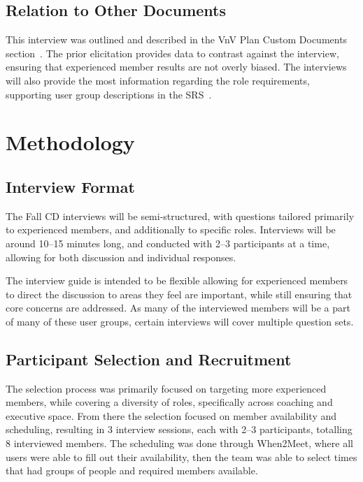 \documentclass{article}
\begin{document}
\subsection{Relation to Other Documents}

This interview was outlined and described in the VnV Plan Custom Documents section~\citep{TroitskyVnVPlan}. 
The prior elicitation provides data to contrast against the interview, ensuring that experienced member 
results are not overly biased. The interviews will also provide the most information regarding the role 
requirements, supporting user group descriptions in the SRS~\citep{TroitskySRS}.

\section{Methodology}
\label{sec:method}

\subsection{Interview Format}
The Fall CD interviews will be semi-structured, with questions tailored
primarily to experienced members, and additionally to specific roles.
Interviews will be around 10--15 minutes long, and conducted with 2--3
participants at a time, allowing for both discussion and individual responses.

The interview guide is intended to be flexible allowing for experienced members
to direct the discussion to areas they feel are important, while still ensuring
that core concerns are addressed. As many of the interviewed members will be a
part of many of these user groups, certain interviews will cover multiple
question sets.

\subsection{Participant Selection and Recruitment}

The selection process was primarily focused on targeting more experienced members, while covering a diversity of 
roles, specifically across coaching and executive space. From there the selection focused on member availability 
and scheduling, resulting in 3 interview sessions, each with 2--3 participants, totalling 8 interviewed members. 
The scheduling was done through When2Meet, where all users were able to fill out their availability, then the 
team was able to select times that had groups of people and required members available.
\end{document}
